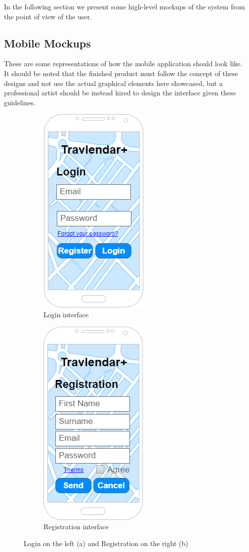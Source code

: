 In the following section we present some high-level mockups of the system from the point of view of the user.
\subsection{Mobile Mockups}
These are some representations of how the mobile application should look like.\\ 
It should be noted that the finished product must follow the concept of these designs and not use the actual graphical elements here showcased, but a professional artist should be instead hired to design the interface given these guidelines.

\begin{figure}[h]
\centering
\begin{subfigure}{.5\textwidth}
  \centering
  \includegraphics[height=.4\textheight, keepaspectratio=true]{Img/Login}
  \caption{Login interface}
\end{subfigure}%
\begin{subfigure}{.5\textwidth}
  \centering
  \includegraphics[height=.4\textheight, keepaspectratio=true]{Img/Registration}
  \caption{Registration interface}
\end{subfigure}
\caption{Login on the left (a) and Registration on the right (b)}
\end{figure}

